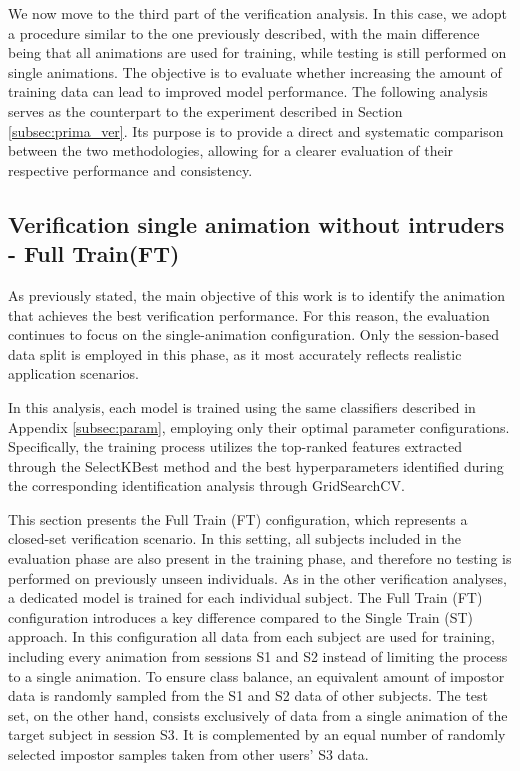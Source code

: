 \documentclass[12pt]{report}
\begin{document}
We now move to the third part of the verification analysis.
In this case, we adopt a procedure similar to the one previously described, with the main difference being that all animations are used for training, while testing is still performed on single animations.
The objective is to evaluate whether increasing the amount of training data can lead to improved model performance.
The following analysis serves as the counterpart to the experiment described in Section \ref{subsec:prima_ver}. 
Its purpose is to provide a direct and systematic comparison between the two methodologies, allowing for a clearer evaluation of their respective performance and consistency.

\subsection{Verification single animation without intruders - Full Train(FT)}
\label{subsec:vft}

As previously stated, the main objective of this work is to identify the animation that achieves the best verification performance. 
For this reason, the evaluation continues to focus on the single-animation configuration. 
Only the session-based data split is employed in this phase, as it most accurately reflects realistic application scenarios.

In this analysis, each model is trained using the same classifiers described in Appendix \ref{subsec:param}, employing only their optimal parameter configurations. 
Specifically, the training process utilizes the top-ranked features extracted through the SelectKBest method and the best hyperparameters identified during the corresponding identification analysis through GridSearchCV.

This section presents the Full Train (FT) configuration, which represents a closed-set verification scenario. 
In this setting, all subjects included in the evaluation phase are also present in the training phase, and therefore no testing is performed on previously unseen individuals.
As in the other verification analyses, a dedicated model is trained for each individual subject. 
The Full Train (FT) configuration introduces a key difference compared to the Single Train (ST) approach. 
In this configuration all data from each subject are used for training, including every animation from sessions S1 and S2 instead of limiting the process to a single animation.
To ensure class balance, an equivalent amount of impostor data is randomly sampled from the S1 and S2 data of other subjects.
The test set, on the other hand, consists exclusively of data from a single animation of the target subject in session S3. 
It is complemented by an equal number of randomly selected impostor samples taken from other users' S3 data.
\end{document}
